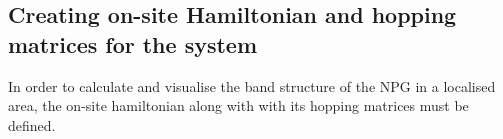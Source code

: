 \subsection{Creating on-site Hamiltonian and hopping matrices for the system}
In order to calculate and visualise the band structure of the NPG in a localised area, the on-site hamiltonian along with with its hopping matrices must be defined. 
